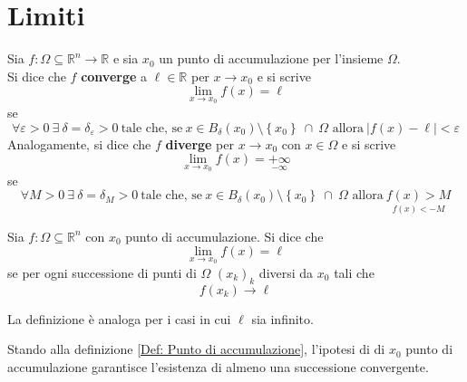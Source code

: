 \section{Limiti}
\begin{definition} \label{Def: Limiti al finito}
    Sia $f:\Omega \subseteq \mathbb{R}^n \to \mathbb{R}$ e sia $x_0$ un punto di accumulazione per l'insieme $\Omega$.\\
    Si dice che $f$ \textbf{converge} a $\ell \in \mathbb{R}$ per $x \to x_0$ e si scrive
    \begin{equation}
        \lim_{x \to x_0}{f(x)}=\ell
    \end{equation} 
    se
    \begin{equation}
        \forall \varepsilon>0 \ \exists\ \delta=\delta_\varepsilon>0\ \text{tale che, se}\ 
                x \in B_\delta(x_0) \setminus \left\{x_0\right\}\ \cap\ \Omega
            \text{ allora}\ |f(x)-\ell|<\varepsilon
    \end{equation}
    Analogamente, si dice che $f$ \textbf{diverge} per $x \to x_0$ con $x \in \Omega$ e si scrive
    \begin{equation}
        \lim_{x \to x_0}{f(x)}=\underset{-\infty}{+\infty}
    \end{equation}
    se 
    \begin{equation}
        \forall M>0 \ \exists\ \delta=\delta_M>0\ \text{tale che, se}\ 
        x \in B_\delta(x_0) \setminus \left\{x_0\right\}\ \cap\ \Omega
            \text{ allora}\ \underset{f(x)<-M}{f(x)>M}
    \end{equation}
\end{definition}
\begin{definition}
    Sia $f:\Omega \subseteq \mathbb{R}^n$ con $x_0$ punto di accumulazione. Si dice che 
    \begin{equation}
        \lim_{x \to x_0}{f(x)}=\ell
    \end{equation}
    se per ogni successione di punti di $\Omega$ $(x_k)_k$ diversi da $x_0$ tali che
    \begin{equation}
        f(x_k)\to \ell
    \end{equation}
    \end{definition}
    \begin{oss}
        La definizione è analoga per i casi in cui $\ell$ sia infinito.
    \end{oss}
    \begin{oss}
        Stando alla definizione \ref{Def: Punto di accumulazione}, l'ipotesi di di $x_0$ punto di accumulazione garantisce l'esistenza di almeno una successione convergente.
    \end{oss}
